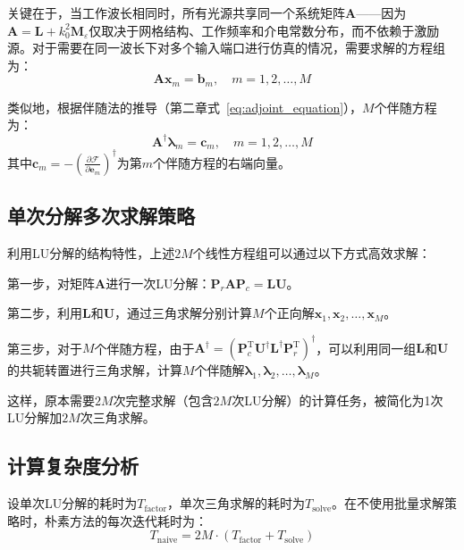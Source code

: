 关键在于，当工作波长相同时，所有光源共享同一个系统矩阵$\boldsymbol{A}$——因为$\boldsymbol{A} = \boldsymbol{L} + k_0^2 \boldsymbol{M}_\varepsilon$仅取决于网格结构、工作频率和介电常数分布，而不依赖于激励源。对于需要在同一波长下对多个输入端口进行仿真的情况，需要求解的方程组为：
\begin{equation}
  \boldsymbol{A} \boldsymbol{x}_m = \boldsymbol{b}_m, \quad m = 1, 2, \ldots, M
  \label{eq:multi_rhs}
\end{equation}

类似地，根据伴随法的推导（第二章式~\eqref{eq:adjoint_equation}），$M$个伴随方程为：
\begin{equation}
  \boldsymbol{A}^{\dagger} \boldsymbol{\lambda}_m = \boldsymbol{c}_m, \quad m = 1, 2, \ldots, M
  \label{eq:multi_adjoint}
\end{equation}
其中$\boldsymbol{c}_m = -\left(\frac{\partial \mathcal{F}}{\partial \boldsymbol{e}_m}\right)^{\dagger}$为第$m$个伴随方程的右端向量。

\subsection{单次分解多次求解策略}

利用LU分解的结构特性，上述$2M$个线性方程组可以通过以下方式高效求解：

第一步，对矩阵$\boldsymbol{A}$进行一次LU分解：$\boldsymbol{P}_r \boldsymbol{A} \boldsymbol{P}_c = \boldsymbol{L}\boldsymbol{U}$。

第二步，利用$\boldsymbol{L}$和$\boldsymbol{U}$，通过三角求解分别计算$M$个正向解$\boldsymbol{x}_1, \boldsymbol{x}_2, \ldots, \boldsymbol{x}_M$。

第三步，对于$M$个伴随方程，由于$\boldsymbol{A}^{\dagger} = (\boldsymbol{P}_c^{\mathrm{T}} \boldsymbol{U}^{\dagger} \boldsymbol{L}^{\dagger} \boldsymbol{P}_r^{\mathrm{T}})^{\dagger}$，可以利用同一组$\boldsymbol{L}$和$\boldsymbol{U}$的共轭转置进行三角求解，计算$M$个伴随解$\boldsymbol{\lambda}_1, \boldsymbol{\lambda}_2, \ldots, \boldsymbol{\lambda}_M$。

这样，原本需要$2M$次完整求解（包含$2M$次LU分解）的计算任务，被简化为1次LU分解加$2M$次三角求解。

\subsection{计算复杂度分析}

设单次LU分解的耗时为$T_{\mathrm{factor}}$，单次三角求解的耗时为$T_{\mathrm{solve}}$。在不使用批量求解策略时，朴素方法的每次迭代耗时为：
\begin{equation}
  T_{\mathrm{naive}} = 2M \cdot (T_{\mathrm{factor}} + T_{\mathrm{solve}})
  \label{eq:naive_time}
\end{equation}

